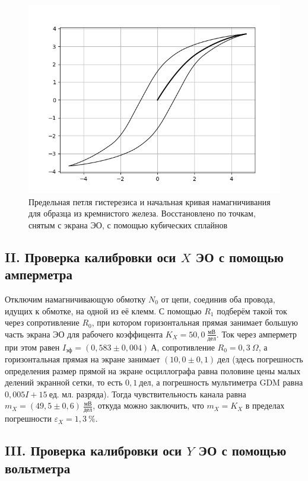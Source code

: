 \documentclass[a4paper, 12pt]{article}
\begin{document}
\begin{figure}[h]
	\centering
	\includegraphics[scale=0.75]{Loop_3}
	\caption{Предельная петля гистерезиса и начальная кривая намагничивания для образца из кремнистого железа. Восстановлено по точкам, снятым с экрана ЭО, с помощью кубических сплайнов} \label{Loop_3}
\end{figure}

\subsection*{II. Проверка калибровки оси $X$ ЭО с помощью амперметра}

Отключим намагничивающую обмотку $N_0$ от цепи, соединив оба провода, идущих к обмотке, на одной из её клемм. С помощью $R_1$ подберём такой ток через сопротивление $R_0$, при котором горизонтальная прямая занимает большую часть экрана ЭО для рабочего коэффицента $K_X=50,0~\frac{\text{мВ}}{\text{дел}}$. Ток через амперметр при этом равен $I_{\text{эф}}=\left(0,583\pm0,004\right)~\text{А}$, сопротивление $R_0=0,3~\Omega$, а горизонтальная прямая на экране занимает $\left(10,0\pm0,1\right)~\text{дел}$ (здесь погрешность определения размер прямой на экране осциллографа равна половине цены малых делений экранной сетки, то есть $0,1~\text{дел}$, а погрешность мультиметра GDM равна $0,005I+15~\text{ед. мл. разряда}$). Тогда чувствительность канала равна $m_X=\left(49,5\pm0,6\right)~\frac{\text{мВ}}{\text{дел}}$, откуда можно заключить, что $m_X=K_X$ в пределах погрешности $\varepsilon_X=1,3~\%$.

\subsection*{III. Проверка калибровки оси $Y$ ЭО с помощью вольтметра}
\end{document}

